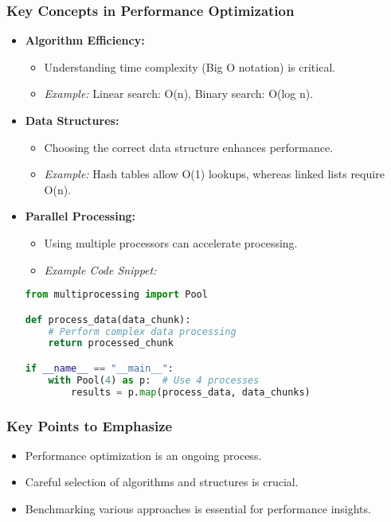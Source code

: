 \documentclass[aspectratio=169]{beamer}
\begin{document}
\begin{frame}[fragile]
    \frametitle{Key Concepts in Performance Optimization}
    \begin{itemize}
        \item \textbf{Algorithm Efficiency:}
            \begin{itemize}
                \item Understanding time complexity (Big O notation) is critical.
                \item \textit{Example:} Linear search: O(n), Binary search: O(log n).
            \end{itemize}
        
        \item \textbf{Data Structures:}
            \begin{itemize}
                \item Choosing the correct data structure enhances performance.
                \item \textit{Example:} Hash tables allow O(1) lookups, whereas linked lists require O(n).
            \end{itemize}
        
        \item \textbf{Parallel Processing:}
            \begin{itemize}
                \item Using multiple processors can accelerate processing.
                \item \textit{Example Code Snippet:}
                \end{itemize}
                \begin{lstlisting}[language=Python]
from multiprocessing import Pool

def process_data(data_chunk):
    # Perform complex data processing
    return processed_chunk

if __name__ == "__main__":
    with Pool(4) as p:  # Use 4 processes
        results = p.map(process_data, data_chunks)
                \end{lstlisting}
    \end{itemize}
\end{frame}

\begin{frame}[fragile]
    \frametitle{Key Points to Emphasize}
    \begin{itemize}
        \item Performance optimization is an ongoing process.
        \item Careful selection of algorithms and structures is crucial.
        \item Benchmarking various approaches is essential for performance insights.
    \end{itemize}
\end{frame}
\end{document}
